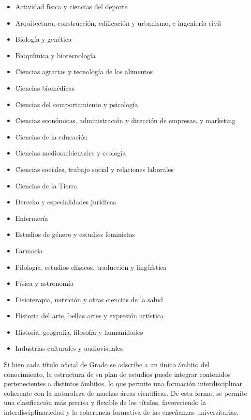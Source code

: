 \documentclass[
  11pt,
  a4paper,
  twoside]{scrreprt}
\providecommand{\tightlist}{%
  \setlength{\itemsep}{0pt}\setlength{\parskip}{0pt}}
\begin{document}
\begin{itemize}
\tightlist
\item
  Actividad física y ciencias del deporte
\item
  Arquitectura, construcción, edificación y urbanismo, e ingeniería
  civil
\item
  Biología y genética
\item
  Bioquímica y biotecnología
\item
  Ciencias agrarias y tecnología de los alimentos
\item
  Ciencias biomédicas
\item
  Ciencias del comportamiento y psicología
\item
  Ciencias económicas, administración y dirección de empresas, y
  marketing
\item
  Ciencias de la educación
\item
  Ciencias medioambientales y ecología
\item
  Ciencias sociales, trabajo social y relaciones laborales
\item
  Ciencias de la Tierra
\item
  Derecho y especialidades jurídicas
\item
  Enfermería
\item
  Estudios de género y estudios feministas
\item
  Farmacia
\item
  Filología, estudios clásicos, traducción y lingüística
\item
  Física y astronomía
\item
  Fisioterapia, nutrición y otras ciencias de la salud
\item
  Historia del arte, bellas artes y expresión artística
\item
  Historia, geografía, filosofía y humanidades
\item
  Industrias culturales y audiovisuales
\end{itemize}

Si bien cada título oficial de Grado se adscribe a un único ámbito del
conocimiento, la estructura de su plan de estudios puede integrar
contenidos pertenecientes a distintos ámbitos, lo que permite una
formación interdisciplinar coherente con la naturaleza de muchas áreas
científicas. De esta forma, se permite una clasificación más precisa y
flexible de los títulos, favoreciendo la interdisciplinariedad y la
coherencia formativa de las enseñanzas universitarias.
\end{document}
